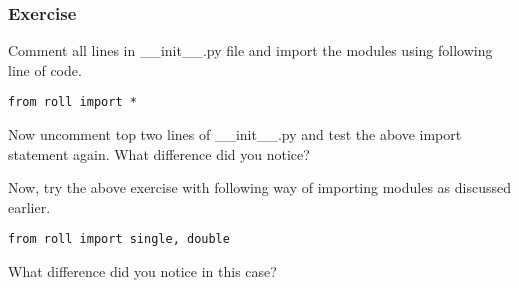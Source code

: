 \documentclass{beamer}
\begin{document}
\begin{frame}[fragile]
\frametitle{Exercise}

Comment all lines in \_\_init\_\_.py file and import the modules using following line of code.

\begin{lstlisting}
from roll import *
\end{lstlisting}

Now uncomment top two lines of \_\_init\_\_.py and  test the above import statement again. What difference did you notice?

Now, try the above exercise with following way of importing modules as discussed earlier.

\begin{lstlisting}
from roll import single, double
\end{lstlisting}

What difference did you notice in this case?

\end{frame}
\end{document}
